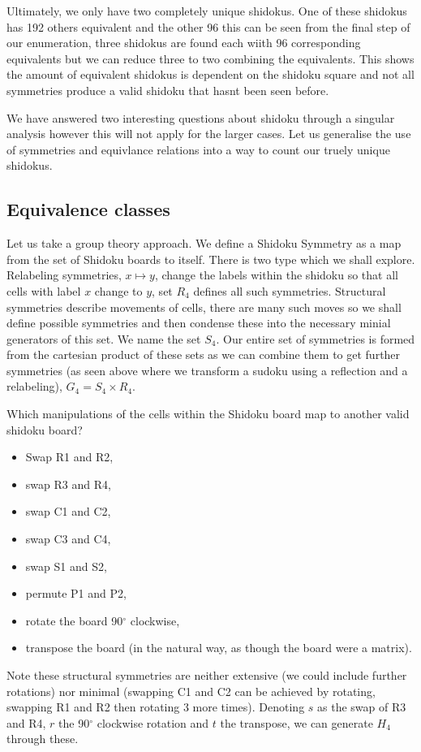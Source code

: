 \documentclass[a4paper,11pt]{report}
\begin{document}
Ultimately, we only have two completely unique shidokus. One of these shidokus has 192 others equivalent and the other 96 this can be seen from the final step of our enumeration, three shidokus are found each wiith 96 corresponding equivalents but we can reduce three to two combining the equivalents. This shows the amount of equivalent shidokus is dependent on the shidoku square and not all symmetries produce a valid shidoku that hasnt been seen before.

We have answered two interesting questions about shidoku through a singular analysis however this will not apply for the larger cases. Let us generalise the use of symmetries and equivlance relations into a way to count our truely unique shidokus.

\subsection{Equivalence classes}
Let us take a group theory approach. We define a Shidoku Symmetry as a map from the set of Shidoku boards to itself. There is two type which we shall explore. Relabeling symmetries, $x\mapsto y$, change the labels within the shidoku so that all cells with label $x$ change to $y$, set $R_4$ defines all such symmetries. Structural symmetries describe movements of cells, there are many such moves so we shall define possible symmetries and then condense these into the necessary minial generators of this set. We name the set $S_4$. Our entire set of symmetries is formed from the cartesian product of these sets as we can combine them to get further symmetries (as seen above where we transform a sudoku using a reflection and a relabeling), $G_4=S_4\times R_4$.

Which manipulations of the cells within the Shidoku board map to another valid shidoku board? 
\begin{itemize}
\item Swap R1 and R2,
\item swap R3 and R4,
\item swap C1 and C2,
\item swap C3 and C4,
\item swap S1 and S2,
\item permute P1 and P2,
\item rotate the board 90$^\circ$ clockwise,
\item transpose the board (in the natural way, as though the board were a matrix).
\end{itemize}
Note these structural symmetries are neither extensive (we could include further rotations) nor minimal (swapping C1 and C2 can be achieved by rotating, swapping R1 and R2 then rotating 3 more times). Denoting $s$ as the swap of R3 and R4, $r$ the 90$^\circ$ clockwise rotation and $t$ the transpose, we can generate $H_4$ through these.
\end{document}
